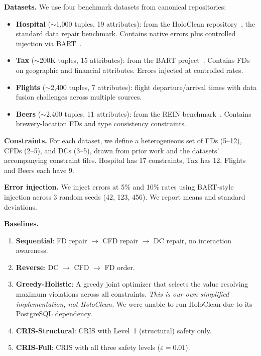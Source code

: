 \documentclass{article}
\newcommand{\cris}{\textsc{CRIS}\xspace}
\begin{document}
\textbf{Datasets.}
We use four benchmark datasets from canonical repositories:
\begin{itemize}
  \item \textbf{Hospital} ($\sim$1,000 tuples, 19 attributes): from the HoloClean repository~\citep{rekatsinas2017holoclean}, the standard data repair benchmark. Contains native errors plus controlled injection via BART~\citep{arocena2015bart}.
  \item \textbf{Tax} ($\sim$200K tuples, 15 attributes): from the BART project~\citep{arocena2015bart}. Contains FDs on geographic and financial attributes. Errors injected at controlled rates.
  \item \textbf{Flights} ($\sim$2,400 tuples, 7 attributes): flight departure/arrival times with data fusion challenges across multiple sources.
  \item \textbf{Beers} ($\sim$2,400 tuples, 11 attributes): from the REIN benchmark~\citep{abdelaal2023rein}. Contains brewery-location FDs and type consistency constraints.
\end{itemize}

\textbf{Constraints.} For each dataset, we define a heterogeneous set of FDs (5--12), CFDs (2--5), and DCs (3--5), drawn from prior work and the datasets' accompanying constraint files. Hospital has 17 constraints, Tax has 12, Flights and Beers each have 9.

\textbf{Error injection.} We inject errors at 5\% and 10\% rates using BART-style injection across 3 random seeds (42, 123, 456). We report means and standard deviations.

\textbf{Baselines.}
\begin{enumerate}
  \item \textbf{Sequential}: FD repair $\to$ CFD repair $\to$ DC repair, no interaction awareness.
  \item \textbf{Reverse}: DC $\to$ CFD $\to$ FD order.
  \item \textbf{Greedy-Holistic}: A greedy joint optimizer that selects the value resolving maximum violations across all constraints. \emph{This is our own simplified implementation, not HoloClean.} We were unable to run HoloClean due to its PostgreSQL dependency.
  \item \textbf{\cris-Structural}: \cris with Level~1 (structural) safety only.
  \item \textbf{\cris-Full}: \cris with all three safety levels ($\varepsilon = 0.01$).
\end{enumerate}
\end{document}

